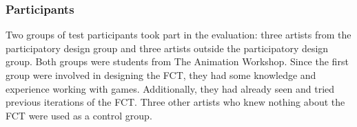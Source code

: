 \subsubsection{Participants}
Two groups of test participants took part in the evaluation: three artists from the participatory design group and three artists outside the participatory design group. Both groups were students from The Animation Workshop. Since the first group were involved in designing the FCT, they had some knowledge and experience working with games. Additionally, they had already seen and tried previous iterations of the FCT. Three other artists who knew nothing about the FCT were used as a control group.